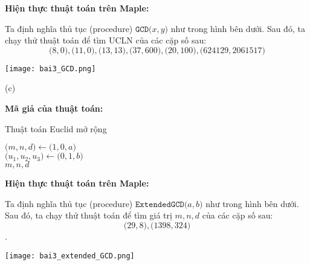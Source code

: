 \textbf{Hiện thực thuật toán trên Maple:}

Ta định nghĩa thủ tục (procedure) $\mathtt{GCD} \big( x, y \big)$ như trong hình bên dưới. Sau đó, ta chạy thử thuật toán để tìm UCLN của các cặp số sau:
$$\big( 8, 0 \big), \big( 11, 0 \big), \big(13, 13 \big), \big( 37, 600 \big), \big( 20, 100 \big), \big( 624129, 2061517 \big)$$

\texttt{[image: bai3\_GCD.png]}

(c)

\textbf{Mã giả của thuật toán:}
\begin{algorithm}
\renewcommand{\algorithmcfname}{Thuật toán}

\caption{Thuật toán Euclid mở rộng}
\SetAlgoNoEnd\SetAlgoNoLine%

$\big( m, n, d \big) \leftarrow \big( 1, 0, a \big)$\\
$\big( u_1, u_2, u_3 \big) \leftarrow \big( 0, 1, b \big)$\\
\Return $m, n, d$
\end{algorithm}

\textbf{Hiện thực thuật toán trên Maple:}

Ta định nghĩa thủ tục (procedure) $\mathtt{ExtendedGCD} \big( a, b \big)$ như trong hình bên dưới. Sau đó, ta chạy thử thuật toán để tìm giá trị $m, n, d$ của các cặp số sau:
$$\big( 29, 8 \big), \big( 1398, 324 \big)$$.

\texttt{[image: bai3\_extended\_GCD.png]}
	
\clearpage